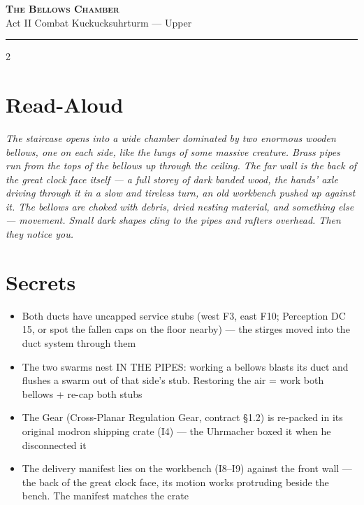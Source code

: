 \documentclass[10pt,letterpaper]{article}
\newcommand{\sceneheader}[4]{%
  \fancyhead[L]{\small\textcolor{accent}{\scshape #1}}%
  \fancyhead[R]{\small\textcolor{accent}{#2 \quad \textbullet \quad #3}}%
  \begin{center}
  {\LARGE\bfseries\scshape\textcolor{accent}{#1}}\\[2pt]
  {\small #2 \quad \textbullet \quad #3 \quad \textbullet \quad #4}\\[2pt]
  \textcolor{rulecol}{\rule{0.5\textwidth}{0.8pt}}
  \end{center}
  \vspace{-4pt}
}
\begin{document}
\newpage


\label{sec:bellows}\sceneheader{The Bellows Chamber}{Act II}{Combat}{Kuckucksuhrturm --- Upper}

\begin{multicols}{2}

\section*{Read-Aloud}
\begin{readaloud}
\itshape
The staircase opens into a wide chamber dominated by two enormous wooden bellows, one on each side, like the lungs of some massive creature. Brass pipes run from the tops of the bellows up through the ceiling. The far wall is the back of the great clock face itself --- a full storey of dark banded wood, the hands' axle driving through it in a slow and tireless turn, an old workbench pushed up against it. The bellows are choked with debris, dried nesting material, and something else --- movement. Small dark shapes cling to the pipes and rafters overhead. Then they notice you.
\end{readaloud}

\section*{Secrets}
\begin{itemize}
\item Both ducts have uncapped service stubs (west F3, east F10; Perception DC 15, or spot the fallen caps on the floor nearby) --- the stirges moved into the duct system through them
\item The two swarms nest IN THE PIPES: working a bellows blasts its duct and flushes a swarm out of that side's stub. Restoring the air = work both bellows + re-cap both stubs
\item The Gear (Cross-Planar Regulation Gear, contract \S1.2) is re-packed in its original modron shipping crate (I4) --- the Uhrmacher boxed it when he disconnected it
\item The delivery manifest lies on the workbench (I8--I9) against the front wall --- the back of the great clock face, its motion works protruding beside the bench. The manifest matches the crate
\end{itemize}


\end{multicols}
\end{document}
